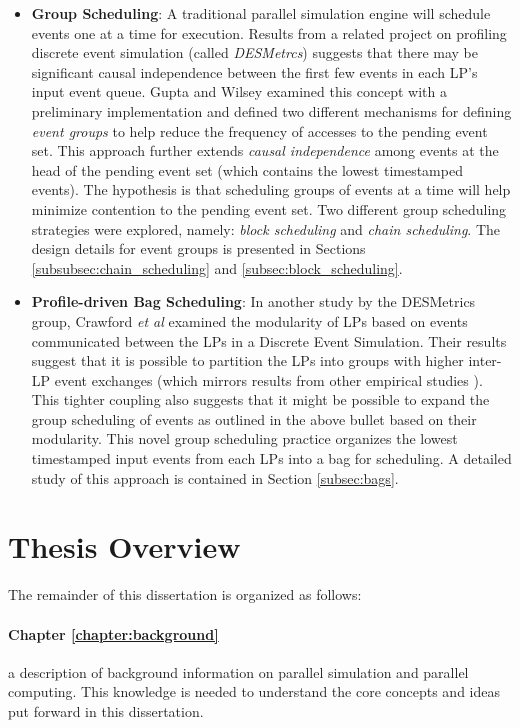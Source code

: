 \documentclass[11pt]{book}
\begin{document}
\begin{itemize}
\item \textbf{Group Scheduling}: A traditional parallel simulation engine will schedule events one at a time
  for execution.  Results from a related project on profiling discrete event simulation (called
  \emph{DESMetrcs}) \cite{wilsey-16} suggests that there may be significant causal independence between the
  first few events in each LP's input event queue.  Gupta and Wilsey \cite{gupta-17} examined this concept
  with a preliminary implementation and defined two different mechanisms for defining \emph{event groups} to
  help reduce the frequency of accesses to the pending event set.  This approach further extends \emph{causal
    independence} among events at the head of the pending event set (which contains the lowest timestamped
  events).  The hypothesis is that scheduling groups of events at a time will help minimize contention to the
  pending event set.  Two different group scheduling strategies were explored, namely: \emph{block scheduling}
  and \emph{chain scheduling}.  The design details for event groups is presented in Sections
  \ref{subsubsec:chain_scheduling} and \ref{subsec:block_scheduling}.

\item \textbf{Profile-driven Bag Scheduling}: In another study by the DESMetrics group, Crawford \emph{et al}
  \cite{crawford-17} examined the modularity of LPs based on events communicated between the LPs in a Discrete
  Event Simulation.  Their results suggest that it is possible to partition the LPs into groups with higher
  inter-LP event exchanges (which mirrors results from other empirical studies \cite{alt-14}).  This tighter
  coupling also suggests that it might be possible to expand the group scheduling of events as outlined in the
  above bullet based on their modularity.  This novel group scheduling practice organizes the lowest
  timestamped input events from each LPs into a bag for scheduling.  A detailed study of this approach is
  contained in Section \ref{subsec:bags}.
    
\end{itemize}

\section{Thesis Overview}
\label{sec:overview}

The remainder of this dissertation is organized as follows:

\paragraph{Chapter \ref{chapter:background}} a description of background information on parallel
simulation and parallel computing.  This knowledge is needed to understand the core concepts and ideas put
forward in this dissertation.
\end{document}
